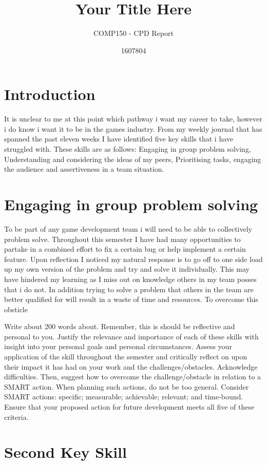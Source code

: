\documentclass{scrartcl}
\title{Your Title Here}
\subtitle{COMP150 - CPD Report}
\author{1607804}
\begin{document}
\maketitle

\section{Introduction}
It is unclear to me at this point which pathway i want my career to take, however i do know i want it to be in the games industry.  From my weekly journal that has spanned the past eleven weeks I have identified five key skills that i have struggled with. These skills are as follows: Engaging in group problem solving, Understanding and considering the ideas of my peers, Prioritising tasks, engaging the audience and assertiveness in a team situation.


\section{Engaging in group problem solving}
To be part of any game development team i will need to be able to collectively problem solve. Throughout this semester I have had many opportunities to partake in a combined effort to fix a certain bug or help implement a certain feature. Upon reflection I noticed my natural response is to go off to one side load up my own version of the problem and try and solve it individually. This may have hindered my learning as I miss out on knowledge others in my team posses that i do not. In addition trying to solve a problem that others in the team are better qualified for will result in a waste of time and resources. To overcome this obsticle 

Write about 200 words about. Remember, this is should be reflective and personal to you. Justify the relevance and importance of each of these skills with insight into your personal goals and personal circumstances. Assess your application of the skill throughout the semester and critically reflect on upon their impact it has had on your work and the challenges/obstacles. Acknowledge difficulties. Then, suggest how to overcome the challenge/obstacle in relation to a SMART action. When planning such actions, do not be too general. Consider SMART actions:
specific; measurable; achievable; relevant; and time-bound. Ensure that your proposed action for future development meets all five of these criteria.

\section{Second Key Skill}
\end{document}
